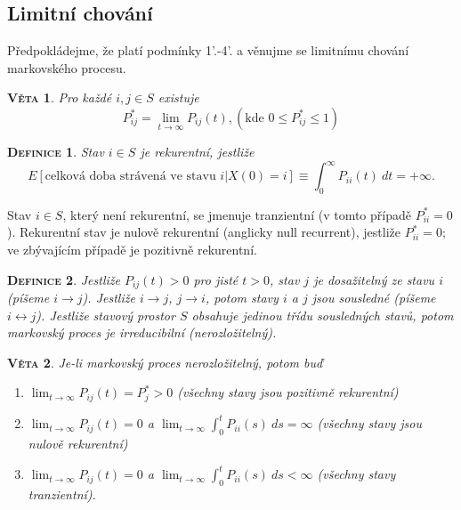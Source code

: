 \documentclass[10pt]{article}
\newtheorem{mydef}{\textsc{Definice}}
\newtheorem{proposition}{\textsc{Věta}}
\begin{document}
\subsection{Limitní chování}

Předpokládejme, že platí podmínky 1'.-4'. a věnujme se limitnímu chování markovského procesu.

\begin{proposition}
Pro každé $i,j \in S$ existuje
\begin{equation}
P^*_{ij}=\lim_{t \to \infty} P_{ij}(t),(\text{kde }0 \leq P_{ij}^* \leq 1)
\end{equation}
\end{proposition}

\begin{mydef}
Stav $i \in S$ je rekurentní, jestliže 
$$
E[\text{celková doba strávená ve stavu }i|X(0)=i] \equiv \int_0^\infty P_{ii}(t) \ dt = +\infty.
$$
\end{mydef}

Stav $i \in S$, který není rekurentní, se jmenuje tranzientní (v tomto případě $P^*_{ii}=0$). Rekurentní stav je nulově rekurentní (anglicky null recurrent), jestliže $P_{ii}^*=0$; ve zbývajícím případě je pozitivně rekurentní.

\begin{mydef}
Jestliže $P_{ij}(t)>0$ pro jisté $t>0$, stav $j$ je dosažitelný ze stavu $i$ (píšeme $i \rightarrow j$). Jestliže  $i \rightarrow j$, $j \rightarrow i$, potom stavy $i$ a $j$ jsou sousledné (píšeme $i \leftrightarrow j$). Jestliže stavový prostor $S$ obsahuje jedinou třídu sousledných stavů, potom markovský proces je irreducibilní (nerozložitelný). 
\end{mydef}

\begin{proposition}
Je-li markovský proces nerozložitelný, potom buď
\begin{enumerate}
\item $\lim_{t \to \infty} P_{ij}(t) = P_j^* >0$ (všechny stavy jsou pozitivně rekurentní)
\item $\lim_{t \to \infty} P_{ij}(t) = 0$ a $\lim_{t \to \infty} \int_0^t P_{ii}(s) \ ds = \infty$ (všechny stavy jsou nulově rekurentní)
\item $\lim_{t \to \infty} P_{ij}(t) = 0$ a $\lim_{t \to \infty} \int_0^t P_{ii}(s) \ ds < \infty$ (všechny stavy tranzientní).
\end{enumerate}
\end{proposition}
\end{document}
